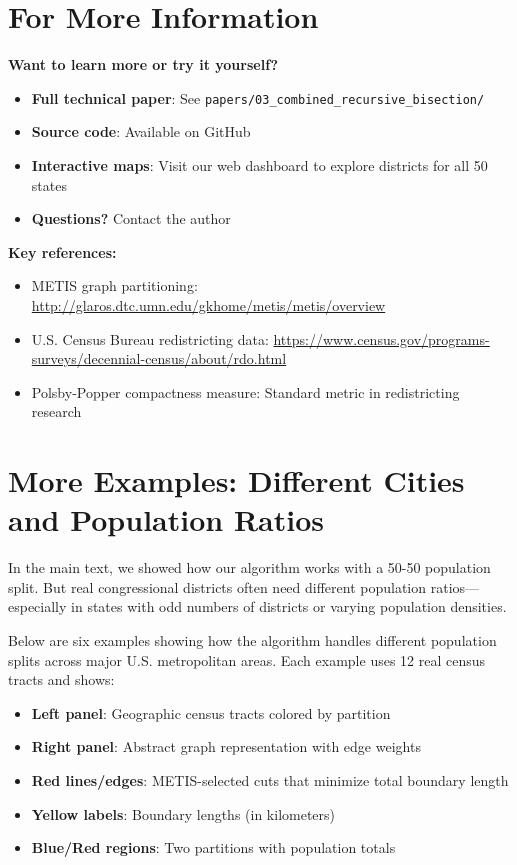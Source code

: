 \documentclass[11pt]{article}
\begin{document}
\section*{For More Information}

\textbf{Want to learn more or try it yourself?}
\begin{itemize}
\item \textbf{Full technical paper}: See \texttt{papers/03\_combined\_recursive\_bisection/}
\item \textbf{Source code}: Available on GitHub
\item \textbf{Interactive maps}: Visit our web dashboard to explore districts for all 50 states
\item \textbf{Questions?} Contact the author
\end{itemize}

\textbf{Key references:}
\begin{itemize}
\item METIS graph partitioning: \url{http://glaros.dtc.umn.edu/gkhome/metis/metis/overview}
\item U.S. Census Bureau redistricting data: \url{https://www.census.gov/programs-surveys/decennial-census/about/rdo.html}
\item Polsby-Popper compactness measure: Standard metric in redistricting research
\end{itemize}

\clearpage
\appendix

\section{More Examples: Different Cities and Population Ratios}

In the main text, we showed how our algorithm works with a 50-50 population split. But real congressional districts often need different population ratios—especially in states with odd numbers of districts or varying population densities.

Below are six examples showing how the algorithm handles different population splits across major U.S. metropolitan areas. Each example uses 12 real census tracts and shows:

\begin{itemize}
\item \textbf{Left panel}: Geographic census tracts colored by partition
\item \textbf{Right panel}: Abstract graph representation with edge weights
\item \textbf{Red lines/edges}: METIS-selected cuts that minimize total boundary length
\item \textbf{Yellow labels}: Boundary lengths (in kilometers)
\item \textbf{Blue/Red regions}: Two partitions with population totals
\end{itemize}
\end{document}
